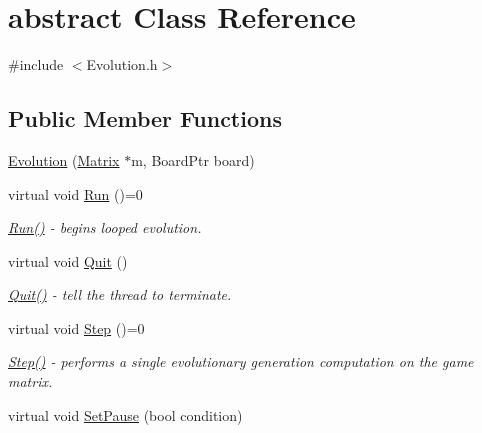 \hypertarget{classabstract}{}\section{abstract Class Reference}
\label{classabstract}


{\ttfamily \#include $<$Evolution.\+h$>$}

\subsection*{Public Member Functions}
\begin{DoxyCompactItemize}
\item 
\hyperlink{classabstract_ab1051dc45e6e791c9ddfc88bed0387ea}{Evolution} (\hyperlink{classMatrix}{Matrix} $\ast$m, Board\+Ptr board)
\item 
\hypertarget{classabstract_ad8d24fd14ed498a4dedb93a63383155d}{}virtual void \hyperlink{classabstract_ad8d24fd14ed498a4dedb93a63383155d}{Run} ()=0\label{classabstract_ad8d24fd14ed498a4dedb93a63383155d}

\begin{DoxyCompactList}\small\item\em \hyperlink{classabstract_ad8d24fd14ed498a4dedb93a63383155d}{Run()} -\/ begins looped evolution. \end{DoxyCompactList}\item 
\hypertarget{classabstract_a75f5d25135b14afe868120a0c4945c9b}{}virtual void \hyperlink{classabstract_a75f5d25135b14afe868120a0c4945c9b}{Quit} ()\label{classabstract_a75f5d25135b14afe868120a0c4945c9b}

\begin{DoxyCompactList}\small\item\em \hyperlink{classabstract_a75f5d25135b14afe868120a0c4945c9b}{Quit()} -\/ tell the thread to terminate. \end{DoxyCompactList}\item 
\hypertarget{classabstract_a1a0ecdaa6b7bfc32a064e4a5e9ccd81d}{}virtual void \hyperlink{classabstract_a1a0ecdaa6b7bfc32a064e4a5e9ccd81d}{Step} ()=0\label{classabstract_a1a0ecdaa6b7bfc32a064e4a5e9ccd81d}

\begin{DoxyCompactList}\small\item\em \hyperlink{classabstract_a1a0ecdaa6b7bfc32a064e4a5e9ccd81d}{Step()} -\/ performs a single evolutionary generation computation on the game matrix. \end{DoxyCompactList}\item 
\hypertarget{classabstract_a4fddd7589c3969ecd3f2d6b13454237f}{}virtual void \hyperlink{classabstract_a4fddd7589c3969ecd3f2d6b13454237f}{Set\+Pause} (bool condition)\label{classabstract_a4fddd7589c3969ecd3f2d6b13454237f}


\end{DoxyCompactItemize}
